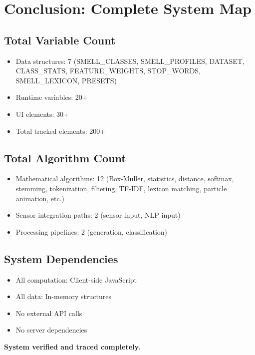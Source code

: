 \documentclass[12pt,a4paper]{article}
\begin{document}
\section{Conclusion: Complete System Map}

\subsection{Total Variable Count}

\begin{itemize}
    \item Data structures: 7 (SMELL\_CLASSES, SMELL\_PROFILES, DATASET, CLASS\_STATS, FEATURE\_WEIGHTS, STOP\_WORDS, SMELL\_LEXICON, PRESETS)
    \item Runtime variables: 20+
    \item UI elements: 30+
    \item Total tracked elements: 200+
\end{itemize}

\subsection{Total Algorithm Count}

\begin{itemize}
    \item Mathematical algorithms: 12 (Box-Muller, statistics, distance, softmax, stemming, tokenization, filtering, TF-IDF, lexicon matching, particle animation, etc.)
    \item Sensor integration paths: 2 (sensor input, NLP input)
    \item Processing pipelines: 2 (generation, classification)
\end{itemize}

\subsection{System Dependencies}

\begin{itemize}
    \item All computation: Client-side JavaScript
    \item All data: In-memory structures
    \item No external API calls
    \item No server dependencies
\end{itemize}

\textbf{System verified and traced completely.}
\end{document}
